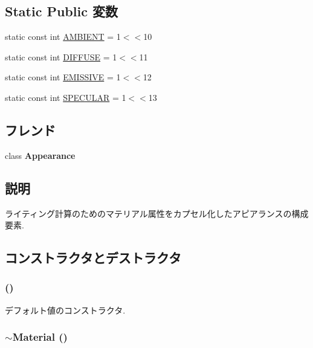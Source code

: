\subsection*{Static Public 変数}
\begin{CompactItemize}
\item 
static const int \hyperlink{classm3g_1_1Material_4cf648a82d9de62a1fb15f4277049594}{AMBIENT} = 1$<$$<$10
\item 
static const int \hyperlink{classm3g_1_1Material_9798073e44254569f47464dc6bf5da89}{DIFFUSE} = 1$<$$<$11
\item 
static const int \hyperlink{classm3g_1_1Material_b92d57adf6955eae6adac15e865659cd}{EMISSIVE} = 1$<$$<$12
\item 
static const int \hyperlink{classm3g_1_1Material_cac20b25665d9a3713bec3a772a89ede}{SPECULAR} = 1$<$$<$13
\end{CompactItemize}
\subsection*{フレンド}
\begin{CompactItemize}
\item 
\hypertarget{classm3g_1_1Material_afa5201a494f65c37039281d9b63a2a9}{
class \textbf{Appearance}}
\label{classm3g_1_1Material_afa5201a494f65c37039281d9b63a2a9}

\end{CompactItemize}


\subsection{説明}
ライティング計算のためのマテリアル属性をカプセル化したアピアランスの構成要素. 

\subsection{コンストラクタとデストラクタ}
\hypertarget{classm3g_1_1Material_ade2019060d01e7983e9bc40ea6aa404}{
\subsubsection[{Material}]{ ()}}
\label{classm3g_1_1Material_ade2019060d01e7983e9bc40ea6aa404}


デフォルト値のコンストラクタ. \hypertarget{classm3g_1_1Material_b15b7efa255e5cca9b02a031a783cfe8}{
\subsubsection[{$\sim$Material}]{\setlength{\rightskip}{0pt plus 5cm}$\sim${\bf Material} ()}}
\label{classm3g_1_1Material_b15b7efa255e5cca9b02a031a783cfe8}


